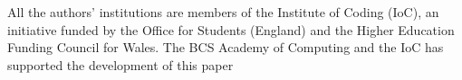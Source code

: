 \documentclass[sigconf]{acmart}
\begin{document}
\begin{acks}
 
  All the authors' institutions are members of the Institute of Coding (IoC), an initiative funded by the Office for Students (England) and the Higher Education Funding Council for Wales. The BCS Academy of Computing and the IoC has supported the development of this paper
 

\end{acks}





\balance
\end{document}
